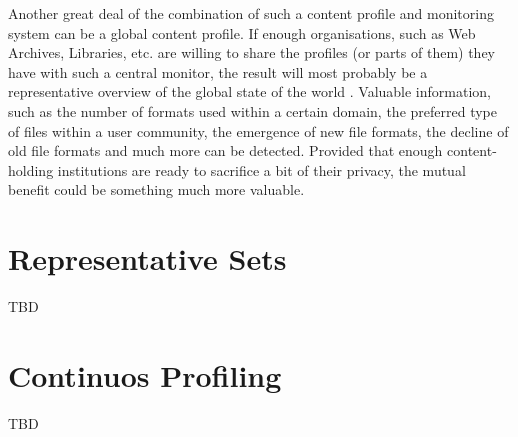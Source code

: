 Another great deal of the combination of such a content profile and monitoring system can be a global content profile. If enough organisations, such as Web Archives, Libraries, etc. are willing to share the profiles (or parts of them) they have with such a central monitor, the result will most probably be a representative overview of the global state of the world \cite{duretec:2012:watch}. Valuable information, such as the number of formats used within a certain domain, the preferred type of files within a user community, the emergence of new file formats, the decline of old file formats and much more can be detected. Provided that enough content-holding institutions are ready to sacrifice a bit of their privacy, the mutual benefit could be something much more valuable.

\section{Representative Sets}
\label{sec:representative_sets}
TBD

\section{Continuos Profiling}
TBD
